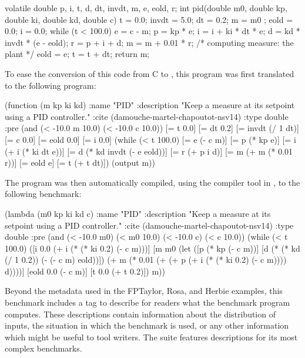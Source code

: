 \documentclass[main.tex]{subfiles}
\begin{document}
\begin{code}
volatile double p, i, t, d, dt, invdt, m, e, eold, r; 
int pid(double m0, double kp, double ki, double kd, double c){
  t     = 0.0;
  invdt = 5.0;
  dt    = 0.2;
  m     = m0 ;
  eold  = 0.0;
  i     = 0.0;
  while (t < 100.0) {
       e = c - m;
       p = kp * e;
       i = i + ki * dt * e;
       d = kd * invdt * (e - eold);
       r = p + i + d;
       m = m + 0.01 * r; /* computing measure: the plant */
       eold = e;
       t = t + dt;
  }
  return m;
}
\end{code}

To ease the conversion of this code from C to \core,
  this program was first translated to the following \surface program:

\begin{code}
(function (m kp ki kd)
 :name "PID"
 :description "Keep a measure at its setpoint using a PID controller."
 :cite (damouche-martel-chapoutot-nsv14)
 :type double
 :pre (and (< -10.0 m 10.0) (< -10.0 c 10.0))
 [= t 0.0]
 [= dt 0.2]
 [= invdt (/ 1 dt)]
 [= c 0.0]
 [= eold 0.0]
 [= i 0.0]
 (while (< t 100.0)
   [= e (- c m)]
   [= p (* kp e)]
   [= i (+ i (* ki dt e))]
   [= d (* kd invdt (- e eold))]
   [= r (+ p i d)]
   [= m (+ m (* 0.01 r))]
   [= eold e]
   [= t (+ t dt)])
 (output m))
\end{code}

The \surface program was then automatically compiled,
  using the compiler tool in \name,
  to the following \core benchmark:

\begin{code}
(lambda (m0 kp ki kd c)
  :name "PID"
  :description "Keep a measure at its setpoint using a PID controller."
  :cite (damouche-martel-chapoutot-nsv14)
  :type double
  :pre (and (< -10.0 m0) (< m0 10.0) (< -10.0 c) (< c 10.0))
  (while (< t 100.0)
   ([i 0.0 (+ i (* (* ki 0.2) (- c m)))]
    [m m0
     (let ([p (* kp (- c m))]
           [d (* (* kd (/ 1 0.2)) (- (- c m) eold))])
     (+ m (* 0.01 (+ (+ p (+ i (* (* ki 0.2) (- c m)))) d))))]
    [eold 0.0 (- c m)]
    [t 0.0 (+ t 0.2)])
   m))
\end{code}

Beyond the metadata used in the FPTaylor, Rosa, and Herbie examples,
  this benchmark includes a  tag
  to describe for readers what the benchmark program computes.
These descriptions contain information about the distribution of inputs,
  the situation in which the benchmark is used,
  or any other information which might be useful to tool writers.
The \name suite features descriptions for its most complex benchmarks.
\end{document}
